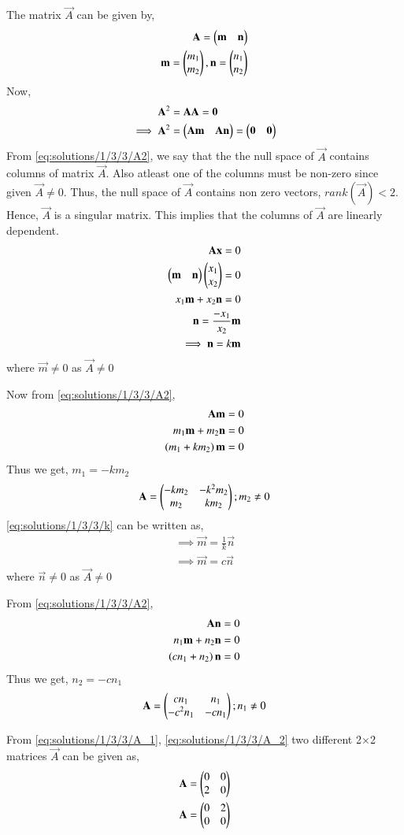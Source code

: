 The matrix $\vec{A}$ can be given by, 
\begin{align}
    \mathbf{A} = \begin{pmatrix}\mathbf{m}&\mathbf{n}\end{pmatrix} \\
    \mathbf{m} = \begin{pmatrix}m_1\\m_2\end{pmatrix}, \mathbf{n} = \begin{pmatrix}n_1\\n_2\end{pmatrix}
\end{align}
Now, 
\begin{align}
    \mathbf{A}^{2} &= \mathbf{A}\mathbf{A} = \mathbf{0} \\
    \implies\mathbf{A}^{2} &= \begin{pmatrix}\mathbf{A}\mathbf{m} & \mathbf{A}\mathbf{n}\end{pmatrix} = \begin{pmatrix}\mathbf{0}&\mathbf{0}\end{pmatrix} \label{eq:solutions/1/3/3/A2}
\end{align}
From \eqref{eq:solutions/1/3/3/A2}, we say that the the null space of $\vec{A}$ contains columns of matrix $\vec{A}$. Also atleast one of the columns must be non-zero since given $\vec{A}\ne0$. 
Thus, the null space of $\vec{A}$ contains non zero vectors, $rank(\vec{A})<2$. Hence, $\vec{A}$ is a singular matrix.
This implies that the columns of $\vec{A}$ are linearly dependent.
\begin{align}
    \mathbf{A}\mathbf{x}=0 \\
    \begin{pmatrix}\mathbf{m}&\mathbf{n}\end{pmatrix}\begin{pmatrix}x_1\\x_2\end{pmatrix} = 0 \\
    x_1\mathbf{m}+x_2\mathbf{n} = 0 \\
    \mathbf{n}= \frac{-x_1}{x_2}\mathbf{m} \\
    \implies\mathbf{n}=k\mathbf{m} \label{eq:solutions/1/3/3/k}
\end{align}
where $\vec{m}\ne0$ as $\vec{A}\ne0$

Now from \eqref{eq:solutions/1/3/3/A2},
\begin{align}
    \mathbf{A}\mathbf{m} &= 0 \\
    m_1\mathbf{m} + m_2\mathbf{n} &= 0 \\
    \left(m_1+km_2\right)\mathbf{m} &= 0
\end{align}
Thus we get, $m_1=-km_2$
\begin{align}
    \mathbf{A} = \begin{pmatrix}-km_2 & -k^2m_2 \\ m_2 & km_2\end{pmatrix} ; m_2\ne0 \label{eq:solutions/1/3/3/A_1}
\end{align}
\eqref{eq:solutions/1/3/3/k} can be written as, 
\begin{align}
    \implies\vec{m}=\frac{1}{k}\vec{n} \\
    \implies\vec{m} = c\vec{n}
\end{align}
where $\vec{n}\ne0$ as $\vec{A}\ne0$

From \eqref{eq:solutions/1/3/3/A2}, 
\begin{align}
    \mathbf{A}\mathbf{n} &=0 \\
    n_1\mathbf{m}+n_2\mathbf{n} &=0 \\
    \left(cn_1+n_2\right)\mathbf{n} &=0
\end{align}
Thus we get, $n_2=-cn_1$
\begin{align}
    \mathbf{A} = \begin{pmatrix}cn_1 & n_1 \\ -c^2n_1 & -cn_1\end{pmatrix} ; n_1\ne0 \label{eq:solutions/1/3/3/A_2}
\end{align}

From \eqref{eq:solutions/1/3/3/A_1}, \eqref{eq:solutions/1/3/3/A_2} two different 2$\times$2 matrices $\vec{A}$ can be given as,
\begin{align}
    \mathbf{A} &= \begin{pmatrix}0&0\\2&0\end{pmatrix} \\
    \mathbf{A} &= \begin{pmatrix}0&2 \\0&0\end{pmatrix}
\end{align}
